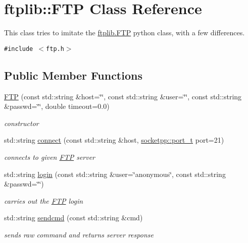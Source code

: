 \hypertarget{classftplib_1_1FTP}{
\section{ftplib::FTP Class Reference}
\label{classftplib_1_1FTP}
}
This class tries to imitate the \hyperlink{classftplib_1_1FTP}{ftplib.FTP} python class, with a few differences.  


{\tt \#include $<$ftp.h$>$}

\subsection*{Public Member Functions}
\begin{CompactItemize}
\item 
\hyperlink{classftplib_1_1FTP_178979abdc58593abdb31a882f370803}{FTP} (const std::string \&host=\char`\"{}\char`\"{}, const std::string \&user=\char`\"{}\char`\"{}, const std::string \&passwd=\char`\"{}\char`\"{}, double timeout=0.0)
\begin{CompactList}\small\item\em constructor \item\end{CompactList}\item 
std::string \hyperlink{classftplib_1_1FTP_fbd3444a33e5dd055474c9a0d6aabba5}{connect} (const std::string \&host, \hyperlink{namespacesocketpp_5517ef80f249b891a2ba64b95fc1e723}{socketpp::port\_\-t} port=21)
\begin{CompactList}\small\item\em connects to given \hyperlink{classftplib_1_1FTP}{FTP} server \item\end{CompactList}\item 
std::string \hyperlink{classftplib_1_1FTP_dc39751d00808d35183fb19c483b3589}{login} (const std::string \&user=\char`\"{}anonymous\char`\"{}, const std::string \&passwd=\char`\"{}\char`\"{})
\begin{CompactList}\small\item\em carries out the \hyperlink{classftplib_1_1FTP}{FTP} login \item\end{CompactList}\item 
std::string \hyperlink{classftplib_1_1FTP_5a876d670107df4b5924238450440eee}{sendcmd} (const std::string \&cmd)
\begin{CompactList}\small\item\em sends raw command and returns server response \item\end{CompactList}\item 

\end{CompactItemize}
